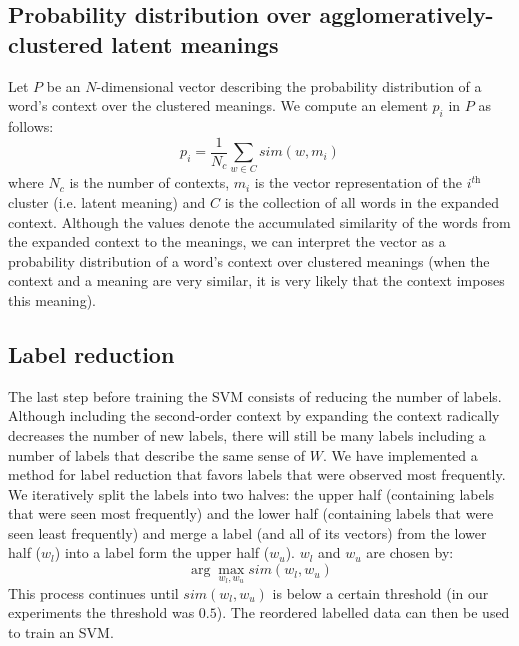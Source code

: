 \documentclass[11pt]{article}
\begin{document}
\subsection{Probability distribution over agglomeratively-clustered latent meanings}
Let $P$ be an $N$-dimensional vector describing the probability distribution of a word's context over the clustered meanings. We compute an element $p_i$ in $P$ as follows:
\begin{equation}\label{pa}p_i = \frac{1}{N_c}\sum\limits_{w\in C}sim(w, m_i)\end{equation}
where $N_c$ is the number of contexts, $m_i$ is the vector representation of the $i^{\textit{th}}$ cluster (i.e. latent meaning) and $C$ is the collection of all words in the expanded context. 
Although the values denote the accumulated similarity of the words from the expanded context to the meanings, we can interpret the vector as a probability distribution of a word's context over clustered meanings (when the context and a meaning are very similar, it is very likely that the context imposes this meaning). 

\subsection{Label reduction}
The last step before training the SVM consists of reducing the number of labels. Although including the second-order context by expanding the context radically decreases the number of new labels, there will still be many labels including a number of labels that describe the same sense of $W$. We have implemented a method for label reduction that favors labels that were observed most frequently. We iteratively split the labels into two halves: the upper half (containing labels that were seen most frequently) and the lower half (containing labels that were seen least frequently) and merge a label (and all of its vectors) from the lower half ($w_l$) into a label form the upper half ($w_u$). $w_l$ and $w_u$ are chosen by: 
$$\arg\max_{w_l, w_u} \textit{sim}(w_l, w_u)$$
This process continues until $\textit{sim}(w_l, w_u)$ is below a certain threshold (in our experiments the threshold was $0.5$).
The reordered labelled data can then be used to train an SVM.
\end{document}
